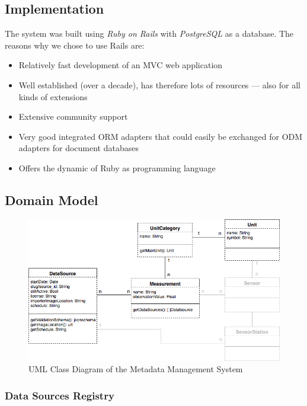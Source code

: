 \subsection{Implementation}\label{implementation}

The system was built using \emph{Ruby on Rails} with \emph{PostgreSQL}
as a database. The reasons why we chose to use Rails are:

\begin{itemize}
\tightlist
\item
  Relatively fast development of an MVC web application
\item
  Well established (over a decade), has therefore lots of resources ---
  also for all kinds of extensions
\item
  Extensive community support
\item
  Very good integrated ORM adapters that could easily be exchanged for
  ODM adapters for document databases
\item
  Offers the dynamic of Ruby as programming language
\end{itemize}

\subsection{Domain Model}\label{domain-model}

\begin{figure}
	\includegraphics[width=1.00\textwidth]{images/relational_schema.png}
	\caption{UML Class Diagram of the Metadata Management System}
	\label{fig:uml-model}
\end{figure}

\subsubsection{Data Sources Registry}\label{data-sources-registry}

